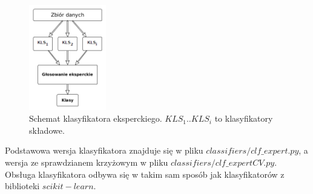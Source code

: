 \begin{figure}[H]
	\centering
	\includegraphics[width=0.3\textwidth]{./images/klas_ekspercki.png}
	\caption[Schemat klasyfikatora eksperckiego]{Schemat klasyfikatora eksperckiego. $KLS_1..KLS_i$ to klasyfikatory składowe.}
	\label{fig:klasyfikator_ekspercki}
\end{figure}
Podstawowa wersja klasyfikatora znajduje się w pliku $classifiers/clf\_expert.py$, a wersja ze sprawdzianem krzyżowym w pliku $classifiers/clf\_expertCV.py$. Obsługa klasyfikatora odbywa się w takim sam sposób jak klasyfikatorów z biblioteki $scikit-learn$.
